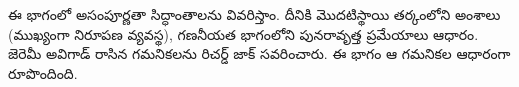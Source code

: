 \documentclass[../../include/open-logic-part]{subfiles}
\begin{document}

\begin{editorial}
 ఈ భాగంలో అసంపూర్ణతా సిద్ధాంతాలను వివరిస్తాం. దీనికి మొదటిస్థాయి తర్కంలోని
 అంశాలు (ముఖ్యంగా నిరూపణ వ్యవస్థ), గణనీయత భాగంలోని పునరావృత్త ప్రమేయాలు
 ఆధారం. జెరెమీ అవిగాడ్ రాసిన గమనికలను రిచర్డ్ జాక్ సవరించారు. ఈ భాగం ఆ
 గమనికల ఆధారంగా రూపొందింది.
\end{editorial}






\OLEndPartHook
\end{document}
